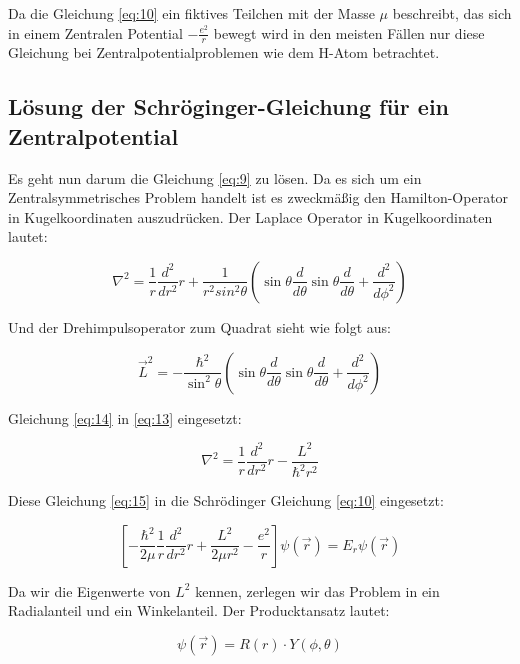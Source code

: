 Da die Gleichung \eqref{eq:10} ein fiktives Teilchen mit der Masse \(\mu\) beschreibt, das sich in einem Zentralen Potential \(-\frac{e^2}{r}\) bewegt wird in den meisten Fällen nur diese Gleichung bei Zentralpotentialproblemen wie dem H-Atom betrachtet.

\subsection*{Lösung der Schröginger-Gleichung für ein Zentralpotential}

Es geht nun darum die Gleichung \eqref{eq:9} zu lösen. Da es sich um ein Zentralsymmetrisches Problem handelt ist es zweckmäßig den Hamilton-Operator in Kugelkoordinaten auszudrücken. Der Laplace Operator in Kugelkoordinaten lautet:

\begin{equation}
  \label{eq:13}
  \nabla^2 = \frac{1}{r}\frac{d^2}{dr^2}r + \frac{1}{r^2sin^2\theta}\left( \sin\theta \frac{d}{d\theta}\sin\theta\frac{d}{d\theta}+\frac{d^2}{d\phi^2}\right) 
\end{equation}

Und der Drehimpulsoperator zum Quadrat sieht wie folgt aus:

\begin{equation}
  \label{eq:14}
  \vec L^2 = -\frac{\hbar^2}{\sin^2\theta}\left( \sin\theta \frac{d}{d\theta}\sin\theta\frac{d}{d\theta}+\frac{d^2}{d\phi^2}\right) 
\end{equation}

Gleichung \eqref{eq:14} in  \eqref{eq:13} eingesetzt:

\begin{equation}
  \label{eq:15}
   \nabla^2 = \frac{1}{r}\frac{d^2}{dr^2}r - \frac{L^2}{\hbar^2r^2}
\end{equation}

Diese Gleichung \eqref{eq:15} in die Schrödinger Gleichung \eqref{eq:10} eingesetzt: 

\begin{equation}
  \label{eq:16}
  \left[-\frac{\hbar^2}{2\mu}\frac{1}{r}\frac{d^2}{dr^2}r + \frac{L^2}{2\mu r^2}  - \frac{e^2}{r} \right]\psi(\vec r) = E_r\psi(\vec r) 
\end{equation}

Da wir die Eigenwerte von \(L^2\) kennen, zerlegen wir das Problem in ein Radialanteil und ein Winkelanteil. Der Producktansatz lautet:

\begin{equation}
  \label{eq:17}
  \psi(\vec r) = R(r)\cdot Y(\phi,\theta) 
\end{equation}

